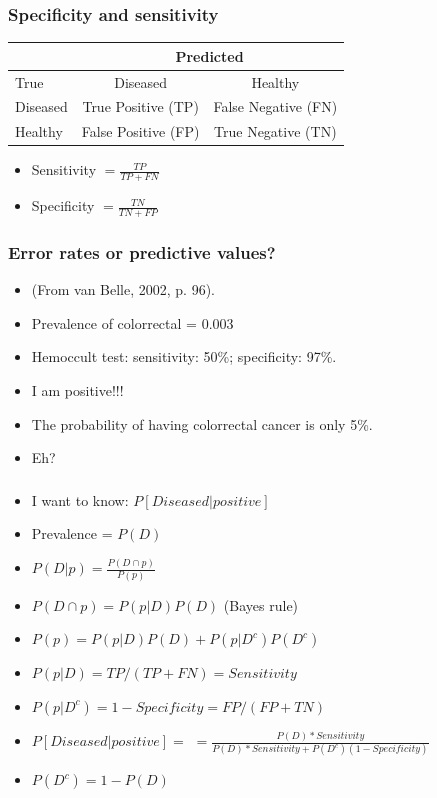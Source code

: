 \begin{frame}
\frametitle{Specificity and sensitivity}
\begin{center}

{\small
\begin{tabular}{l|cc}
 &\multicolumn{2}{c}{Predicted}\\
\hline
True & Diseased & Healthy\\
\hline
Diseased & True Positive (TP) & False Negative (FN)\\
Healthy & False Positive (FP) & True Negative (TN)\\
\hline
\end{tabular}
}
\end{center}


\begin{itemize}
\item Sensitivity $=\frac{TP}{TP + FN}$
\item Specificity $= \frac{TN}{TN + FP}$
\end{itemize}

\end{frame}


\begin{frame}
\frametitle{Error rates or predictive values?}
\begin{itemize}
\item (From van Belle, 2002, p. 96).
\item  Prevalence of colorrectal = 0.003
\item Hemoccult test: sensitivity: 50\%; specificity: 97\%.
\item I am positive!!!
\pause
\item The probability of having colorrectal cancer is only 5\%.
\item Eh?
\end{itemize}
\end{frame}

\begin{frame}
\frametitle{}
\begin{itemize}
\item I want to know: $P\left[Diseased|positive\right]$
\item Prevalence = $P(D)$
\item $P(D|p) = \frac{P(D \cap p)}{P(p)}$
\item $P(D \cap p) = P(p|D) P(D)$ (Bayes rule)
\item $P(p) = P(p|D) P(D) + P(p|D^c) P(D^c)$
\item $P(p|D) = TP/(TP + FN) = Sensitivity$
\item $P(p|D^c) = 1 - Specificity = FP/(FP + TN)$
\item $P\left[Diseased|positive\right] = $
$ = \frac{P(D) * Sensitivity }{P(D) * Sensitivity + P(D^c) (1 -
  Specificity)}$
\item $ P(D^c) = 1 - P(D) $
\end{itemize}
\end{frame}


